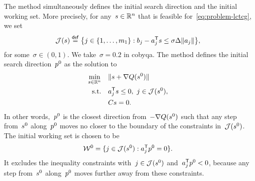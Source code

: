 The method simultaneously defines the initial search direction and the initial working set.
More precisely, for any~$\sstep \in \R^n$ that is feasible for~\cref{eq:problem-lctcg}, we set
\begin{equation*}
    \mathcal{J}(\sstep) \eqdef \set[\big]{j \in \set{1, \dots, m_1} : b_j - a_j^{\T} \sstep \le \sigma \rad \norm{a_j}},
\end{equation*}
for some~$\sigma \in (0, 1)$.
We take~$\sigma = 0.2$ in \gls{cobyqa}.
The method defines the initial search direction~$\pstep[0]$ as the solution to
\begin{subequations}
    \label{eq:tcg-linear-working-set}
    \begin{align}
        \min_{\sstep \in \R^n}  & \quad \norm{\sstep + \nabla Q(\sstep[0])}\\
        \text{s.t.}             & \quad a_j^{\T} \sstep \le 0, ~ j \in \mathcal{J}(\sstep[0]),\\
                                & \quad C \sstep = 0.
    \end{align}
\end{subequations}
In other words,~$\pstep[0]$ is the closest direction from~$-\nabla Q(\sstep[0])$ such that any step from~$\sstep[0]$ along~$\pstep[0]$ moves no closer to the boundary of the constraints in~$\mathcal{J}(\sstep[0])$.
The initial working set is chosen to be
\begin{equation}
    \label{eq:tcg-linear-working-set-initial}
    \mathcal{W}^0 = \set{j \in \mathcal{J}(\sstep[0]) : a_j^{\T} \pstep[0] = 0}.
\end{equation}
It excludes the inequality constraints with~$j \in \mathcal{J}(\sstep[0])$ and~$a_j^{\T} \pstep[0] < 0$, because any step from~$\sstep[0]$ along~$\pstep[0]$ moves further away from these constraints.


